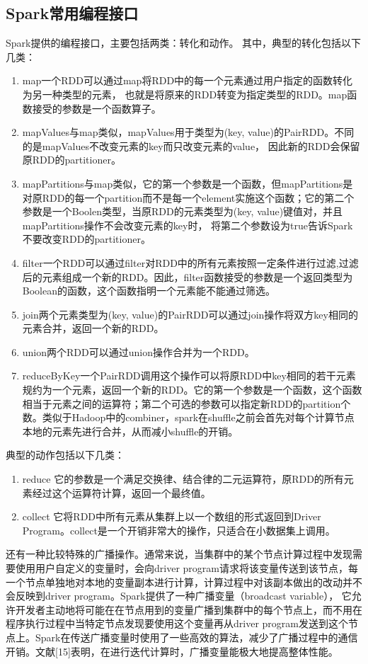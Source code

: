 \documentclass[master]{njuthesis}
\begin{document}
\subsection{Spark常用编程接口}
Spark提供的编程接口，主要包括两类：转化和动作。
其中，典型的转化包括以下几类： 
\begin{enumerate}
 \item {\asciifamily map}一个RDD可以通过map将RDD中的每一个元素通过用户指定的函数转化为另一种类型的元素，
 也就是将原来的RDD转变为指定类型的RDD。map函数接受的参数是一个函数算子。
 \item {\asciifamily mapValues}与map类似，mapValues用于类型为(key, value)的PairRDD。不同的是mapValues不改变元素的key而只改变元素的value，
 因此新的RDD会保留原RDD的partitioner。
 \item {\asciifamily mapPartitions}与map类似，它的第一个参数是一个函数，但mapPartitions是对原RDD的每一个partition而不是每一个element实施这个函数；它的第二个参数是一个Boolen类型，当原RDD的元素类型为(key, value)键值对，并且mapPartitions操作不会改变元素的key时，
 将第二个参数设为true告诉Spark不要改变RDD的partitioner。
\item {\asciifamily filter}一个RDD可以通过filter对RDD中的所有元素按照一定条件进行过滤,过滤后的元素组成一个新的RDD。因此，filter函数接受的参数是一个返回类型为Boolean的函数，这个函数指明一个元素能不能通过筛选。
\item {\asciifamily join}两个元素类型为(key, value)的PairRDD可以通过join操作将双方key相同的元素合并，返回一个新的RDD。
\item {\asciifamily union}两个RDD可以通过union操作合并为一个RDD。
\item {\asciifamily reduceByKey}一个PairRDD调用这个操作可以将原RDD中key相同的若干元素规约为一个元素，返回一个新的RDD。它的第一个参数是一个函数，这个函数相当于元素之间的运算符；第二个可选的参数可以指定新RDD的partition个数。类似于Hadoop中的combiner，spark在shuffle之前会首先对每个计算节点本地的元素先进行合并，从而减小shuffle的开销。
\end{enumerate}
典型的动作包括以下几类：
\begin{enumerate}
 \item {\asciifamily reduce} 它的参数是一个满足交换律、结合律的二元运算符，原RDD的所有元素经过这个运算符计算，返回一个最终值。
 \item {\asciifamily collect} 它将RDD中所有元素从集群上以一个数组的形式返回到Driver Program。collect是一个开销非常大的操作，只适合在小数据集上调用。
\end{enumerate}
还有一种比较特殊的广播操作。通常来说，当集群中的某个节点计算过程中发现需要使用用户自定义的变量时，会向driver program请求将该变量传送到该节点，每一个节点单独地对本地的变量副本进行计算，计算过程中对该副本做出的改动并不会反映到driver program。Spark提供了一种广播变量（broadcast variable）， 
它允许开发者主动地将可能在在节点用到的变量广播到集群中的每个节点上，而不用在程序执行过程中当特定节点发现要使用这个变量再从driver program发送到这个节点上。Spark在传送广播变量时使用了一些高效的算法，减少了广播过程中的通信开销。文献[15]表明，在进行迭代计算时，广播变量能极大地提高整体性能。
\end{document}

